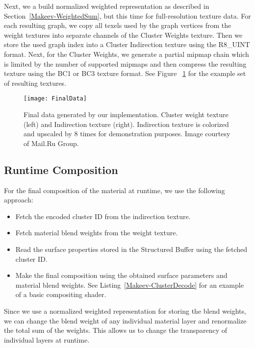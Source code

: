 Next, we a build normalized weighted representation as described in Section~\ref{Makeev-WeightedSum}, but this time for full-resolution texture data.
For each resulting graph, we copy all texels used by the graph vertices from the weight textures into separate channels of the Cluster Weights texture.
Then we store the used graph index into a Cluster Indirection texture using the R8{\_}UINT format.
Next, for the Cluster Weights, we generate a partial mipmap chain which is limited by the number of supported mipmaps and then compress the resulting texture using the BC1 or BC3 texture format.
See Figure ~\ref{Makeev-FinalData} for the example set of resulting textures.

\begin{figure}\centering
\texttt{[image: FinalData]}
\caption{Final data generated by our implementation. Cluster weight texture (left) and Indirection texture (right). Indirection texture is colorized and upscaled by 8 times for demonstration purposes. Image courtesy of Mail.Ru Group.} 
\label{Makeev-FinalData}
\end{figure}

\subsection{Runtime Composition}

For the final composition of the material at runtime, we use the following approach:\par

\begin{itemize}  
\item Fetch the encoded cluster ID from the indirection texture.
\item Fetch material blend weights from the weight texture.
\item Read the surface properties stored in the Structured Buffer using the fetched cluster ID.
\item Make the final composition using the obtained surface parameters and material blend weights. See Listing~\ref{Makeev-ClusterDecode} for an example of a basic compositing shader.
\end{itemize}

Since we use a normalized weighted representation for storing the blend weights, we can change the blend weight of any individual material layer and renormalize the total sum of the weights.
This allows us to change the transparency of individual layers at runtime.

